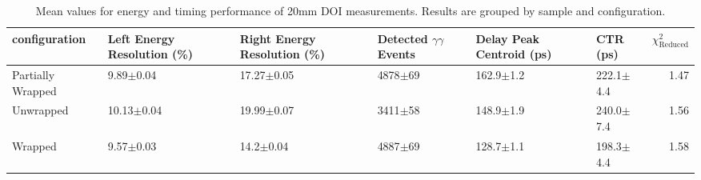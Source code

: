 \begin{table}
\caption{\label{doictrresults-20} Mean values for energy and timing performance of 20mm DOI measurements. Results are grouped by sample and configuration.}
\begin{tabular}{llllllr}
\hline
configuration & Left Energy Resolution (\%) & Right Energy Resolution (\%) & Detected $\gamma\gamma$ Events & Delay Peak Centroid (ps)  & CTR (ps) &  $\chi^2_\text{Reduced}$ \\
\hline
Partially Wrapped   &        9.89$\pm$0.04 &   17.27$\pm$0.05 &  4878$\pm$69 &  162.9$\pm$1.2 &  222.1$\pm$4.4 &        1.47 \\
Unwrapped     &       10.13$\pm$0.04 &   19.99$\pm$0.07 &  3411$\pm$58 &  148.9$\pm$1.9 &  240.0$\pm$7.4 &        1.56 \\
Wrapped       &        9.57$\pm$0.03 &    14.2$\pm$0.04 &  4887$\pm$69 &  128.7$\pm$1.1 &  198.3$\pm$4.4 &        1.58 \\
\hline
\end{tabular}
\end{table}